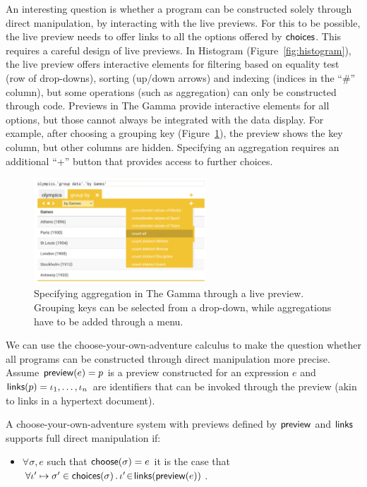 \documentclass[ a4paper,UKenglish,cleveref, autoref, thm-restate]{lipics-v2021}
\newcommand{\ident}[1]{\textsf{#1}}
\newcommand{\select}{\textnormal{\ident{choose}}}
\newcommand{\choices}{\textnormal{\ident{choices}}}
\newcommand{\preview}{\textnormal{\ident{preview}}}
\newcommand{\links}{\textnormal{\ident{links}}}
\begin{document}
An interesting question is whether a program can be constructed solely through direct manipulation,
by interacting with the live previews. For this to be possible, the live preview needs to
offer links to all the options offered by $\choices$. This requires a careful design
of live previews. In Histogram (Figure~\ref{fig:histogram}), the live preview offers interactive
elements for filtering based on equality test (row of drop-downs), sorting (up/down arrows)
and indexing (indices in the ``\#'' column), but some operations (such as aggregation) can only
be constructed through code. Previews in The Gamma provide interactive elements for all options,
but those cannot always be integrated with the data display. For example, after choosing a grouping
key (Figure~\ref{fig:groupby}), the preview shows the key column, but other columns are hidden.
Specifying an aggregation requires an additional ``+'' button that provides access to further choices.

\begin{figure}[t]
\vspace{-1em}
\includegraphics[width=0.575\textwidth]{fig/thegamma3.png}
\caption{Specifying aggregation in The Gamma through a live preview. Grouping keys can be
  selected from a drop-down, while aggregations have to be added through a menu.}
\label{fig:groupby}
\end{figure}

We can use the choose-your-own-adventure calculus to make the question whether all
programs can be constructed through direct manipulation more precise. Assume
$\preview(e)=p$ is a preview constructed for an expression $e$ and $\links(p)=\iota_1, \ldots, \iota_n$
are identifiers that can be invoked through the preview (akin to links in a hypertext document).

\begin{definition}
A choose-your-own-adventure system with previews defined by $\preview$ and $\links$ supports
full direct manipulation if:
\begin{itemize}
\item $\forall \sigma, e$ such that $\select(\sigma)=e$ it is the case that
  $\forall \iota'\mapsto\sigma'\in\choices(\sigma)\,.\,\iota'\!\in\!\links(\preview(e))$.
\end{itemize}
\end{definition}
\end{document}
